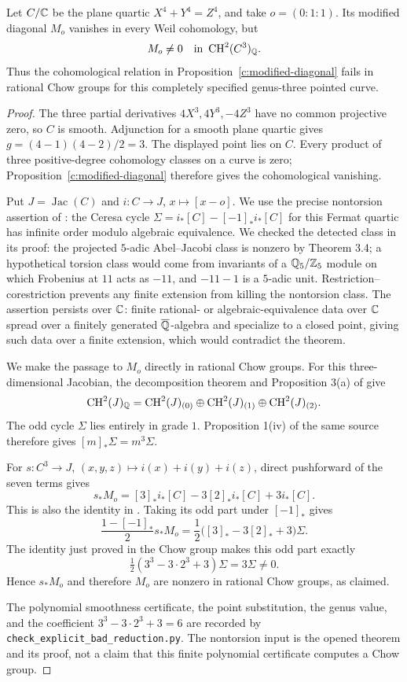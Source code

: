 \begin{example}
\label{c:fermat-counterexample}
Let $C/\mathbb C$ be the plane quartic $X^4+Y^4=Z^4$, and take $o=(0:1:1)$. Its modified diagonal $M_o$ vanishes in every Weil cohomology, but
\[
 M_o\ne0\quad\hbox{in }\operatorname{CH}^2(C^3)_\mathbb Q.
\]
Thus the cohomological relation in Proposition~\ref{c:modified-diagonal} fails in rational Chow groups for this completely specified genus-three pointed curve.
\end{example}

\begin{proof}
The three partial derivatives $4X^3,4Y^3,-4Z^3$ have no common projective zero, so $C$ is smooth. Adjunction for a smooth plane quartic gives $g=(4-1)(4-2)/2=3$. The displayed point lies on $C$. Every product of three positive-degree cohomology classes on a curve is zero; Proposition~\ref{c:modified-diagonal} therefore gives the cohomological vanishing.

Put $J=\operatorname{Jac}(C)$ and $i:C\to J$, $x\mapsto[x-o]$. We use the precise nontorsion assertion of \citet[Theorem 4.1, printed p.~104]{c_bloch1984}: the Ceresa cycle $\Sigma=i_*[C]-[-1]_*i_*[C]$ for this Fermat quartic has infinite order modulo algebraic equivalence. We checked the detected class in its proof: the projected $5$-adic Abel--Jacobi class is nonzero by Theorem 3.4; a hypothetical torsion class would come from invariants of a $\mathbb Q_5/\mathbb Z_5$ module on which Frobenius at $11$ acts as $-11$, and $-11-1$ is a $5$-adic unit. Restriction--corestriction prevents any finite extension from killing the nontorsion class. The assertion persists over $\mathbb C$: finite rational- or algebraic-equivalence data over $\mathbb C$ spread over a finitely generated $\overline{\mathbb Q}$-algebra and specialize to a closed point, giving such data over a finite extension, which would contradict the theorem.

We make the passage to $M_o$ directly in rational Chow groups. For this three-dimensional Jacobian, the decomposition theorem and Proposition 3(a) of \citet[pp.~647--649]{c_beauville1986} give
\[
 \operatorname{CH}^2(J)_\mathbb Q=\operatorname{CH}^2(J)_{(0)}\oplus\operatorname{CH}^2(J)_{(1)}\oplus\operatorname{CH}^2(J)_{(2)}.
\]
The odd cycle $\Sigma$ lies entirely in grade $1$. Proposition 1(iv) of the same source therefore gives $[m]_*\Sigma=m^3\Sigma$.

For $s:C^3\to J$, $(x,y,z)\mapsto i(x)+i(y)+i(z)$, direct pushforward of the seven terms gives
\[
 s_*M_o=[3]_*i_*[C]-3[2]_*i_*[C]+3i_*[C].
\]
This is also the identity in \citet[Proposition 5.3]{c_grossschoen1995}. Taking its odd part under $[-1]_*$ gives
\[
 \frac{1-[-1]_*}{2}s_*M_o
 =\frac12\bigl([3]_* -3[2]_*+3\bigr)\Sigma.
\]
The identity just proved in the Chow group makes this odd part exactly
\[
 \tfrac12(3^3-3\cdot2^3+3)\Sigma=3\Sigma\ne0.
\]
Hence $s_*M_o$ and therefore $M_o$ are nonzero in rational Chow groups, as claimed.

The polynomial smoothness certificate, the point substitution, the genus value, and the coefficient $3^3-3\cdot2^3+3=6$ are recorded by \texttt{check\_explicit\_bad\_reduction.py}. The nontorsion input is the opened theorem and its proof, not a claim that this finite polynomial certificate computes a Chow group.
\end{proof}

